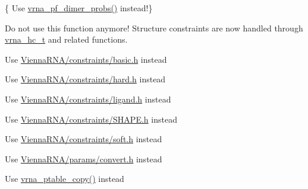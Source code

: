 \begin{DoxyRefList}
\item[Global \mbox{\hyperlink{group__part__func__global__deprecated_ga94c19120130e66a667a10a3c8598550c}{compute\+\_\+probabilities}} (double F\+AB, double F\+EA, double F\+EB, vrna\+\_\+ep\+\_\+t $\ast$pr\+AB, vrna\+\_\+ep\+\_\+t $\ast$prA, vrna\+\_\+ep\+\_\+t $\ast$prB, int Alength)]\label{deprecated__deprecated000115}%
%
\{ Use \mbox{\hyperlink{group__part__func__global_gaa1e39e73afb51fbaf4ae38f0c066c46b}{vrna\+\_\+pf\+\_\+dimer\+\_\+probs()}} instead!\} 
\item[Global \mbox{\hyperlink{hard_8h_a36c3a6c3218b041f992052767bc74549}{constrain\+\_\+ptypes}} (const char $\ast$constraint, unsigned int length, char $\ast$ptype, int $\ast$\+BP, int min\+\_\+loop\+\_\+size, unsigned int idx\+\_\+type)]\label{deprecated__deprecated000160}%
%
Do not use this function anymore! Structure constraints are now handled through \mbox{\hyperlink{group__hard__constraints_gac7e4c4f8abe3163a68110c5bff24e01d}{vrna\+\_\+hc\+\_\+t}} and related functions. 
\item[File \mbox{\hyperlink{constraints_8h}{constraints.h}} ]\label{deprecated__deprecated000040}%
%
Use \mbox{\hyperlink{constraints_2basic_8h}{Vienna\+R\+N\+A/constraints/basic.\+h}} instead  
\item[File \mbox{\hyperlink{constraints__hard_8h}{constraints\+\_\+hard.h}} ]\label{deprecated__deprecated000041}%
%
Use \mbox{\hyperlink{hard_8h}{Vienna\+R\+N\+A/constraints/hard.\+h}} instead  
\item[File \mbox{\hyperlink{constraints__ligand_8h}{constraints\+\_\+ligand.h}} ]\label{deprecated__deprecated000042}%
%
Use \mbox{\hyperlink{ligand_8h}{Vienna\+R\+N\+A/constraints/ligand.\+h}} instead  
\item[File \mbox{\hyperlink{constraints__SHAPE_8h}{constraints\+\_\+\+S\+H\+A\+PE.h}} ]\label{deprecated__deprecated000043}%
%
Use \mbox{\hyperlink{SHAPE_8h}{Vienna\+R\+N\+A/constraints/\+S\+H\+A\+P\+E.\+h}} instead  
\item[File \mbox{\hyperlink{constraints__soft_8h}{constraints\+\_\+soft.h}} ]\label{deprecated__deprecated000044}%
%
Use \mbox{\hyperlink{soft_8h}{Vienna\+R\+N\+A/constraints/soft.\+h}} instead  
\item[File \mbox{\hyperlink{convert__epars_8h}{convert\+\_\+epars.h}} ]\label{deprecated__deprecated000045}%
%
Use \mbox{\hyperlink{convert_8h}{Vienna\+R\+N\+A/params/convert.\+h}} instead  
\item[Global \mbox{\hyperlink{group__struct__utils__deprecated_gafeaa6d68eef3a99d0a7aa08aa91c6601}{copy\+\_\+pair\+\_\+table}} (const short $\ast$pt)]\label{deprecated__deprecated000201}%
%
Use \mbox{\hyperlink{group__struct__utils__pair__table_ga2daefbbd6d9f8803731651882f54332d}{vrna\+\_\+ptable\+\_\+copy()}} instead



\end{DoxyRefList}
